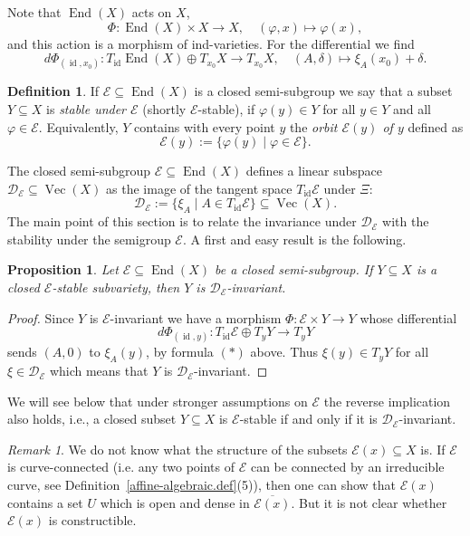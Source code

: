 \documentclass{amsart}
\newtheorem{prop}[thm]{Proposition}
\theoremstyle{definition}
\newtheorem{defn}[thm]{Definition}
\theoremstyle{remark}
\newtheorem{rem}[thm]{Remark}
\begin{document}
Note that $\operatorname{End}(X)$ acts on $X$,  
$$
\Phi\colon \operatorname{End}(X) \times X \to X, \quad({\varphi},x)\mapsto {\varphi}(x),
$$ 
and this action is a morphism of ind-varieties. For the differential we find
\[\tag{$*$}
d\Phi_{(\operatorname{id},x_{0})}\colon T_\operatorname{id}\operatorname{End}(X) \oplus T_{x_{0}}X \to T_{x_{0}}X, \quad (A,\delta)\mapsto \xi_{A}(x_{0})+\delta.
\]
\begin{defn}
If ${\mathcal E} {\subseteq} \operatorname{End}(X)$ is a closed semi-subgroup we say that a subset $Y {\subseteq} X$ is {\it stable under ${\mathcal E}$} (shortly ${\mathcal E}$-stable), if 
${\varphi}(y) \in Y$ for all $y\in Y$ and all ${\varphi}\in{\mathcal E}$. Equivalently,
$Y$ contains with every point $y$ the {\it orbit  ${\mathcal E}(y)$ of $y$} defined as
$$
{\mathcal E}(y):=\{{\varphi}(y) \mid {\varphi}\in {\mathcal E}\}.
$$
\end{defn}
The closed semi-subgroup ${\mathcal E} {\subseteq} \operatorname{End}(X)$ defines a linear subspace ${\mathcal D}_{\mathcal E}{\subseteq}\operatorname{Vec}(X)$ as the image of the tangent space $T_\operatorname{id}{\mathcal E}$ under $\Xi$:
$$
{\mathcal D}_{\mathcal E}:= \{\xi_{A}\mid A \in T_\operatorname{id}{\mathcal E}\} {\subseteq} \operatorname{Vec}(X).
$$
The main point of this section is to relate the invariance under ${\mathcal D}_{\mathcal E}$ with the stability under the semigroup ${\mathcal E}$. A first and easy result is the following.

\begin{prop}\label{E&D-invariance.prop}
Let ${\mathcal E} \subseteq \operatorname{End}(X)$ be a closed semi-subgroup. If $Y {\subseteq} X$ is a closed ${\mathcal E}$-stable subvariety, 
then $Y$ is ${\mathcal D}_{\mathcal E}$-invariant.
\end{prop}
\begin{proof}
Since $Y$ is ${\mathcal E}$-invariant we have a morphism $\Phi\colon {\mathcal E} \times Y \to Y$ whose differential
$$
d\Phi_{(\operatorname{id},y)}\colon T_\operatorname{id} {\mathcal E} \oplus T_{y}Y \to T_{y}Y
$$
sends $(A,0)$ to $\xi_{A}(y)$, by  formula $(*)$ above. Thus $\xi(y) \in T_{y}Y$ for all $\xi \in {\mathcal D}_{\mathcal E}$ which means that $Y$ is ${\mathcal D}_{\mathcal E}$-invariant.
\end{proof}
We will see below that under stronger assumptions on ${\mathcal E}$ the reverse implication also holds, i.e., a closed subset $Y {\subseteq} X$ is ${\mathcal E}$-stable if and only if it is ${\mathcal D}_{\mathcal E}$-invariant.
\begin{rem}
We do not know what the structure of the subsets ${\mathcal E}(x) {\subseteq} X$ is. If ${\mathcal E}$ is curve-connected (i.e. any two points of ${\mathcal E}$ can be connected by an irreducible curve, see Definition~\ref{affine-algebraic.def}(5)), then one can show that ${\mathcal E}(x)$ contains a set $U$ which is open and dense in $\overline{{\mathcal E}(x)}$. But it is not clear whether ${\mathcal E}(x)$ is constructible.
\end{rem}
\end{document}
